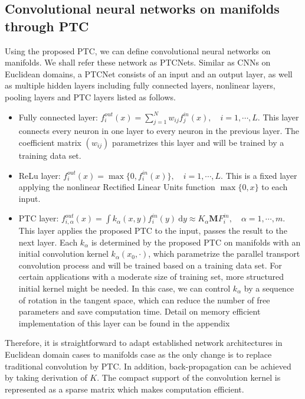 \documentclass[10pt,twocolumn,letterpaper]{article}
\begin{document}
\subsection{Convolutional neural networks on manifolds through PTC}
Using the proposed PTC, we can define convolutional neural networks on manifolds. We shall refer these network as PTCNets.
Similar as CNNs on Euclidean domains, a PTCNet consists of an input and an output layer, as well as multiple hidden layers including fully connected layers, nonlinear layers, pooling layers and PTC layers listed as follows.
\begin{itemize}[leftmargin=0.4cm]
\item Fully connected layer: $f_i^{out}(x) = \sum_{j=1}^{N} w_{ij} f^{in}_j(x),  \quad i = 1,\cdots,L$. This layer connects every neuron in one layer to every neuron in the previous layer.
The coefficient matrix $(w_{ij})$ parametrizes this layer and will be trained by a training data set.
\item ReLu layer: $f^{out}_i(x) = \max\{0,f_i^{in}(x)\}, \quad i = 1,\cdots,L$. This is a fixed layer applying the nonlinear Rectified Linear Units function $\max\{0,x\}$ to each input.
\item PTC layer: $f^{out}_{i,\alpha}(x) = \int k_\alpha(x,y) f^{in}_i(y) ~\mathrm{d} y \approx K_{\alpha}\textbf{M} F^{in}_i, \quad \alpha = 1,\cdots, m$.
This layer applies the proposed PTC to the input, passes the result to the next layer.
Each $k_\alpha$ is determined by the proposed PTC on manifolds with an initial convolution kernel $k_\alpha(x_0,\cdot)$, which parametrize the parallel transport convolution process and will be trained based on a training data set. For certain applications with a moderate size of training set, more structured initial kernel might be needed. In this case, we can control $k_\alpha$ by a sequence of rotation in the tangent space, which can reduce the number of free parameters and save computation time. Detail on memory efficient implementation of this layer can be found in the appendix
\end{itemize}
Therefore, it is straightforward to adapt established network architectures in Euclidean domain cases to manifolds case as the only change is to replace traditional convolution by PTC. In addition, back-propagation can be achieved by taking derivation of $K$. The compact support of the convolution kernel is represented as a sparse matrix which makes computation efficient.
\end{document}
